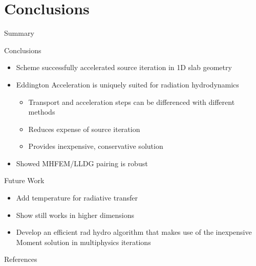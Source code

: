 \documentclass[10pt]{beamer}
\begin{document}
\section{Conclusions}

\begin{frame}{Summary}

	\onslide<+->
	Conclusions
	\begin{itemize} \vspace{-.1in}
		\item Scheme successfully accelerated source iteration in 1D slab geometry

		\item Eddington Acceleration is uniquely suited for radiation hydrodynamics 
		\begin{itemize}
			\item Transport and acceleration steps can be differenced with different methods 
			\item Reduces expense of source iteration 
			\item Provides inexpensive, conservative solution 
		\end{itemize}

		\item Showed MHFEM/LLDG pairing is robust 

	\end{itemize}

	\onslide<+->
	Future Work 
	\begin{itemize} \vspace{-.1in}

		\item Add temperature for radiative transfer 

		\item Show still works in higher dimensions 

		\item Develop an efficient rad hydro algorithm that makes use of the inexpensive Moment solution in multiphysics iterations 

	\end{itemize}

\end{frame}

\appendix

\begin{frame}{References}

	\nocite{adams,morel,llnl,alcouffe,mhfem,hydro,bolding,nonlinearAccel}
	
	

\end{frame}
\end{document}
